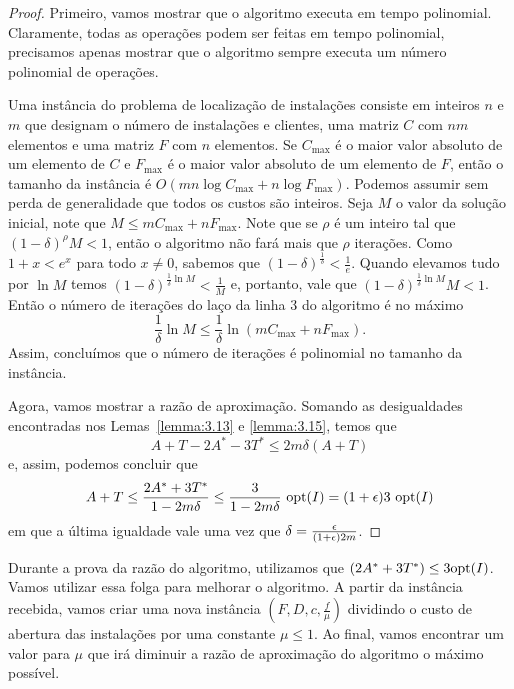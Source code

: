 \begin{proof}
    Primeiro, vamos mostrar que o algoritmo executa em tempo polinomial. Claramente, todas as operações podem ser feitas em tempo polinomial, precisamos apenas mostrar que o algoritmo sempre executa um número polinomial de operações.

    Uma instância do problema de localização de instalações consiste em inteiros $n$ e $m$ que designam o número de instalações e clientes, uma matriz $C$ com $nm$ elementos e uma matriz $F$ com $n$ elementos. Se $C_\text{max}$ é o maior valor absoluto de um elemento de $C$ e $F_\text{max}$ é o maior valor absoluto de um elemento de $F$, então o tamanho da instância é $O(mn\log{C_\text{max}} + n\log{F_\text{max}})$. 
    Podemos assumir sem perda de generalidade que todos os custos são inteiros. Seja $M$ o valor da solução inicial, note que $M \leq mC_\text{max} + nF_\text{max}$. Note que se $\rho$ é um inteiro tal que $(1-\delta)^\rho M < 1$, então o algoritmo não fará mais que $\rho$ iterações. Como $ 1 + x < e^x$ para todo $x\neq 0$, sabemos que $(1 - \delta)^{\frac{1}{\delta}} < \frac{1}{e}$. Quando elevamos tudo por $\ln M$ temos $(1- \delta)^{\frac{1}{\delta}\ln M} < \frac{1}{M}$ e, portanto, vale que $ (1- \delta)^{\frac{1}{\delta}\ln M}M < 1$. Então o número de iterações do laço da linha 3 do algoritmo é no máximo 
    \begin{equation}
        \frac{1}{\delta}\ln M \leq \frac{1}{\delta} \ln(mC_\text{max} + nF_\text{max}).  \nonumber
    \end{equation}
    Assim, concluímos que o número de iterações é polinomial no tamanho da instância.

    Agora, vamos mostrar a razão de aproximação. Somando as desigualdades encontradas nos Lemas~\ref{lemma:3.13} e \ref{lemma:3.15}, temos que 
        \[A + T - 2A^* - 3T^* \leq 2m\delta(A+T)\] 
        e, assim, podemos concluir que
        \[A+T \leq \frac{2A^* + 3T^*}{1-2m\delta} \leq \frac{3}{1-2m\delta} \ \mathrm{opt}(I) = (1+\epsilon)3 \ \mathrm{opt}(I)\]
        em que a última igualdade vale uma vez que $\delta = \frac{\epsilon}{(1+\epsilon)2m}$.
\end{proof}

Durante a prova da razão do algoritmo, utilizamos que $(2A^* + 3T^*) \leq 3\mathrm{opt}(I)$. Vamos utilizar essa folga para melhorar o algoritmo. 
A partir da instância recebida, vamos criar uma nova instância $(F,D,c,\frac{f}{\mu})$ dividindo o custo de abertura das instalações por uma constante $\mu \leq 1$. Ao final, vamos encontrar um valor para $\mu$ que irá diminuir a razão de aproximação do algoritmo o máximo possível. 

